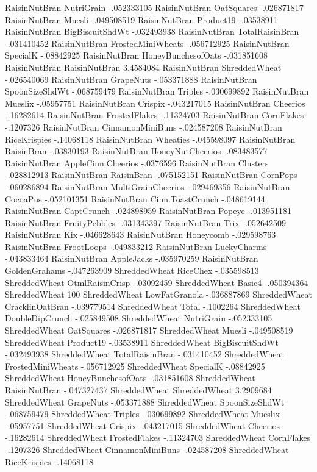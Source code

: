 RaisinNutBran	NutriGrain	-.052333105
RaisinNutBran	OatSquares	-.026871817
RaisinNutBran	Muesli	-.049508519
RaisinNutBran	Product19	-.03538911
RaisinNutBran	BigBiscuitShdWt	-.032493938
RaisinNutBran	TotalRaisinBran	-.031410452
RaisinNutBran	FrostedMiniWheats	-.056712925
RaisinNutBran	SpecialK	-.08842925
RaisinNutBran	HoneyBunchesofOats	-.031851608
RaisinNutBran	RaisinNutBran	3.4584084
RaisinNutBran	ShreddedWheat	-.026540069
RaisinNutBran	GrapeNuts	-.053371888
RaisinNutBran	SpoonSizeShdWt	-.068759479
RaisinNutBran	Triples	-.030699892
RaisinNutBran	Mueslix	-.05957751
RaisinNutBran	Crispix	-.043217015
RaisinNutBran	Cheerios	-.16282614
RaisinNutBran	FrostedFlakes	-.11324703
RaisinNutBran	CornFlakes	-.1207326
RaisinNutBran	CinnamonMiniBuns	-.024587208
RaisinNutBran	RiceKrispies	-.14068118
RaisinNutBran	Wheaties	-.045598097
RaisinNutBran	RaisinBran	-.03830193
RaisinNutBran	HoneyNutCheerios	-.083483577
RaisinNutBran	AppleCinn.Cheerios	-.0376596
RaisinNutBran	Clusters	-.028812913
RaisinNutBran	RaisinBran	-.075152151
RaisinNutBran	CornPops	-.060286894
RaisinNutBran	MultiGrainCheerios	-.029469356
RaisinNutBran	CocoaPus	-.052101351
RaisinNutBran	Cinn.ToastCrunch	-.048619144
RaisinNutBran	CaptCrunch	-.024898959
RaisinNutBran	Popeye	-.013951181
RaisinNutBran	FruityPebbles	-.031343397
RaisinNutBran	Trix	-.052642509
RaisinNutBran	Kix	-.046628643
RaisinNutBran	Honeycomb	-.029598763
RaisinNutBran	FrootLoops	-.049833212
RaisinNutBran	LuckyCharms	-.043833464
RaisinNutBran	AppleJacks	-.035970259
RaisinNutBran	GoldenGrahams	-.047263909
ShreddedWheat	RiceChex	-.035598513
ShreddedWheat	OtmlRaisinCrisp	-.03092459
ShreddedWheat	Basic4	-.050394364
ShreddedWheat	100%
ShreddedWheat	LowFatGranola	-.036887869
ShreddedWheat	CracklinOatBran	-.039779514
ShreddedWheat	Total	-.1002264
ShreddedWheat	DoubleDipCrunch	-.025849508
ShreddedWheat	NutriGrain	-.052333105
ShreddedWheat	OatSquares	-.026871817
ShreddedWheat	Muesli	-.049508519
ShreddedWheat	Product19	-.03538911
ShreddedWheat	BigBiscuitShdWt	-.032493938
ShreddedWheat	TotalRaisinBran	-.031410452
ShreddedWheat	FrostedMiniWheats	-.056712925
ShreddedWheat	SpecialK	-.08842925
ShreddedWheat	HoneyBunchesofOats	-.031851608
ShreddedWheat	RaisinNutBran	-.047327437
ShreddedWheat	ShreddedWheat	3.2909684
ShreddedWheat	GrapeNuts	-.053371888
ShreddedWheat	SpoonSizeShdWt	-.068759479
ShreddedWheat	Triples	-.030699892
ShreddedWheat	Mueslix	-.05957751
ShreddedWheat	Crispix	-.043217015
ShreddedWheat	Cheerios	-.16282614
ShreddedWheat	FrostedFlakes	-.11324703
ShreddedWheat	CornFlakes	-.1207326
ShreddedWheat	CinnamonMiniBuns	-.024587208
ShreddedWheat	RiceKrispies	-.14068118
